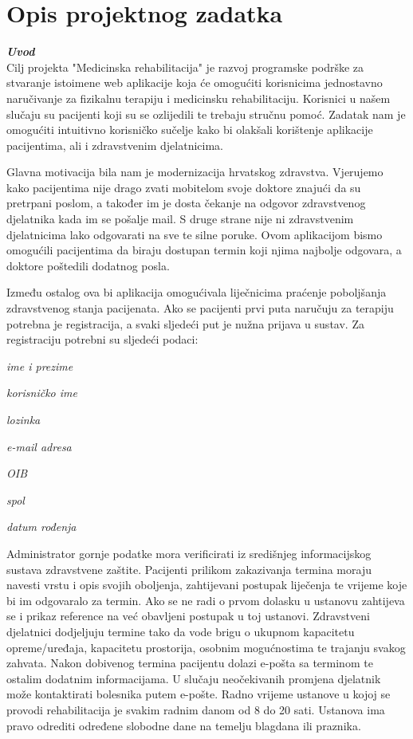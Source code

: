 \chapter{Opis projektnog zadatka}

\textbf{\textit{Uvod}}\\

Cilj projekta "Medicinska rehabilitacija" je razvoj programske podrške za stvaranje istoimene web aplikacije koja će omogućiti korisnicima jednostavno naručivanje za fizikalnu terapiju i medicinsku rehabilitaciju. Korisnici u našem slučaju su pacijenti koji su se ozlijedili te trebaju stručnu pomoć. Zadatak nam je omogućiti intuitivno korisničko sučelje kako bi olakšali korištenje aplikacije pacijentima, ali i zdravstvenim djelatnicima.

Glavna motivacija bila nam je modernizacija hrvatskog zdravstva. Vjerujemo kako pacijentima nije drago zvati mobitelom svoje doktore znajući da su pretrpani poslom, a također im je dosta čekanje na odgovor zdravstvenog djelatnika kada im se pošalje mail. S druge strane nije ni zdravstvenim djelatnicima lako odgovarati na sve te silne poruke. Ovom aplikacijom bismo omogućili pacijentima da biraju dostupan termin koji njima najbolje odgovara, a doktore poštedili dodatnog posla.

Između ostalog ova bi aplikacija omogućivala liječnicima praćenje poboljšanja zdravstvenog stanja pacijenata. Ako se pacijenti prvi puta naručuju za terapiju potrebna je registracija, a svaki sljedeći put je nužna prijava u sustav. Za registraciju potrebni su sljedeći podaci: 
\begin{packed_item}
	\item \textit{ime i prezime}
	\item \textit{korisničko ime}
	\item \textit{lozinka}
	\item \textit{e-mail adresa}
	\item \textit{OIB}
	\item \textit{spol}
	\item \textit{datum rođenja}
\end{packed_item}

Administrator gornje podatke mora verificirati iz središnjeg informacijskog sustava zdravstvene zaštite. Pacijenti prilikom zakazivanja termina moraju navesti vrstu i opis svojih oboljenja, zahtijevani postupak liječenja te vrijeme koje bi im odgovaralo za termin. Ako se ne radi o prvom dolasku u ustanovu zahtijeva se i prikaz reference na već obavljeni postupak u toj ustanovi. Zdravstveni djelatnici dodjeljuju termine tako da vode brigu o ukupnom kapacitetu opreme/uređaja, kapacitetu prostorija, osobnim mogućnostima te trajanju svakog zahvata. Nakon dobivenog termina pacijentu dolazi e-pošta sa terminom te ostalim dodatnim informacijama. U slučaju neočekivanih promjena djelatnik može kontaktirati bolesnika putem e-pošte. Radno vrijeme ustanove u kojoj se provodi rehabilitacija je svakim radnim danom od 8 do 20 sati. Ustanova ima pravo odrediti određene slobodne dane na temelju blagdana ili praznika.\\

